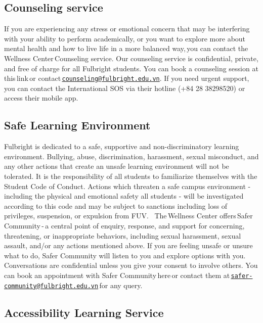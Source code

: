 \documentclass[
]{article}
\begin{document}
\subsection*{Counseling service}\label{counseling-service}

If you are experiencing any stress or emotional concern that may be interfering with your ability to perform academically, or you want to explore more about mental health and how to live life in a more balanced way,\,you can contact the Wellness Center\,Counseling service.
Our counseling service is confidential, private, and free of charge for all Fulbright students. You can book a counseling session at this\,link\,or contact\,\href{mailto:counseling@fulbright.edu.vn}{\nolinkurl{counseling@fulbright.edu.vn}}. If you need urgent support, you can contact the International SOS via their hotline (+84 28 38298520) or access their mobile app.

\subsection*{Safe Learning Environment\,}\label{safe-learning-environment}

Fulbright is dedicated to a safe, supportive and non-discriminatory learning environment. Bullying, abuse, discrimination, harassment, sexual misconduct, and any other actions that create an unsafe learning environment will not be tolerated. It is the responsibility of all students to familiarize themselves with the\,Student Code of Conduct. Actions which threaten a safe campus environment - including the physical and emotional safety all students - will be investigated according to this code and may be subject to sanctions including loss of privileges, suspension, or expulsion from FUV.
\,
The\,Wellness Center offers\,Safer Community\,-\,a central point of enquiry, response, and support for concerning, threatening, or inappropriate behaviors, including sexual harassment, sexual assault, and/or any actions mentioned above. If you are feeling unsafe or unsure what to do, Safer Community will listen to you and explore options with you. Conversations are confidential unless you give your consent to involve others. You can book an appointment with Safer Community\,here\,or contact them at\,\href{mailto:safer-community@fulbright.edu.vn}{\nolinkurl{safer-community@fulbright.edu.vn}}\,for any query.

\subsection*{Accessibility Learning Service}\label{accessibility-learning-service}
\end{document}
